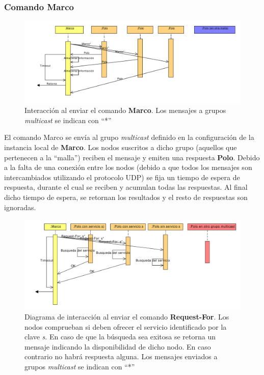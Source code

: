 \subsubsection{Comando \textbf{Marco}}

\begin{figure}[H]
\centering
\includegraphics[width=\textwidth]{Diagrams/Sequence/marcocompleto}
\caption[Interacción al enviar el comando \textbf{Marco}]{Interacción al enviar el comando \textbf{Marco}. Los mensajes a grupos \textit{multicast} se indican con ``*''}
\label{fig:secuencia_marco}
\end{figure}

El comando Marco se envía al grupo \textit{multicast} definido en la configuración de la instancia local de \textbf{Marco}. Los nodos suscritos a dicho grupo (aquellos que pertenecen a la ``malla'') reciben el mensaje y emiten una respuesta \textbf{Polo}. Debido a la falta de una conexión entre los nodos (debido a que todos los mensajes son intercambiados utilizando el protocolo UDP) se fija un tiempo de espera de respuesta, durante el cual se reciben y acumulan todas las respuestas. Al final dicho tiempo de espera, se retornan los resultados y el resto de respuestas son ignoradas.

\begin{figure}[H]
	\centering
	\includegraphics[width=\textwidth]{Diagrams/Sequence/request_for}
	\caption[Interacción al enviar el comando \textbf{Request-For}]{Diagrama de interacción al enviar el comando \textbf{Request-For}. Los nodos comprueban si deben ofrecer el servicio identificado por la clave \textit{s}. En caso de que la búsqueda sea exitosa se retorna un mensaje indicando la disponibilidad de dicho nodo. En caso contrario no habrá respuesta alguna.
	Los mensajes enviados a grupos \textit{multicast} se indican con ``*''}
	\label{fig:secuencia_request_for}
\end{figure}

